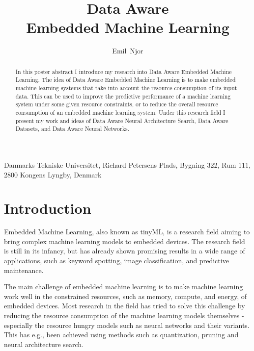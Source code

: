 \documentclass{acaces}
\begin{document}
\title{Data Aware\\Embedded Machine Learning
}

\author{
    Emil~Njor
}

\address{1}{
    Danmarks Tekniske Universitet,
    Richard Petersens Plads,
    Bygning 322,
    Rum 111,
    2800 Kongens Lyngby,
    Denmark
}


\pagestyle{empty}


\begin{abstract}
    In this poster abstract I introduce my research into Data Aware Embedded Machine Learning.
    The idea of Data Aware Embedded Machine Learning is to make embedded machine learning systems that take into account the resource consumption of its input data.
    This can be used to improve the predictive performance of a machine learning system under some given resource constraints, or to reduce the overall resource consumption of an embedded machine learning system.
    Under this research field I present my work and ideas of Data Aware Neural Architecture Search, Data Aware Datasets, and Data Aware Neural Networks.
\end{abstract}
\newline
{}

\section{Introduction}
Embedded Machine Learning, also known as tinyML, is a research field aiming to bring complex machine learning models to embedded devices. 
The research field is still in its infancy, but has already shown promising results in a wide range of applications, such as keyword spotting, image classification, and predictive maintenance.

The main challenge of embedded machine learning is to make machine learning work well in the constrained resources, such as memory, compute, and energy, of embedded devices.
Most research in the field has tried to solve this challenge by reducing the resource consumption of the machine learning models themselves - especially the resource hungry models such as neural networks and their variants.
This has e.g., been achieved using methods such as quantization, pruning and neural architecture search\cite{njor2022primer}.
\end{document}
